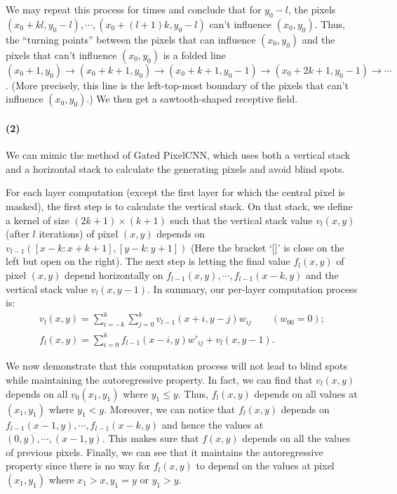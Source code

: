 \documentclass[a4 paper,12pt]{article}
\begin{document}
We may repeat this process for times and conclude that for $y_0-l$, the pixels $(x_0+kl,y_0-l),\cdots,(x_0+(l+1)k,y_0-l)$ can't influence $(x_0,y_0)$. Thus, the ``turning points'' between the pixels that can influence $(x_0,y_0)$ and the pixels that can't influence $(x_0,y_0)$ is a folded line $(x_0+1,y_0)\to (x_0+k+1,y_0)\to (x_0+k+1,y_0-1)\to(x_0+2k+1,y_0-1)\to\cdots$. (More precisely, this line is the left-top-most boundary of the pixels that can't influence $(x_0,y_0)$.)
We then get a sawtooth-shaped receptive field.

\paragraph*{(2)}
We can mimic the method of Gated PixelCNN, which uses both a vertical stack and a horizontal stack to calculate the generating pixels and avoid blind spots.

For each layer computation (except the first layer for which the central pixel is masked), the first step is to calculate the vertical stack. On that stack, we define a kernel of size $(2k+1)\times (k+1)$ such that the vertical stack value $v_l(x,y)$ (after $l$ iterations) of pixel $(x,y)$ depends on $v_{l-1}([x-k:x+k+1],[y-k:y+1])$ (Here the bracket `[]' is close on the left but open on the right). The next step is letting the final value $f_l(x,y)$ of pixel $(x,y)$ depend horizontally on $f_{l-1}(x,y),\cdots,f_{l-1}(x-k,y)$ and the vertical stack value $v_l(x,y-1)$. In summary, our per-layer computation process is:
\begin{gather*}
v_l(x,y)=\sum_{i=-k}^{k}\sum_{j=0}^{k}v_{l-1}(x+i,y-j)w_{ij}\qquad(w_{00}=0);\\
f_l(x,y)=\sum_{i=0}^{k}f_{l-1}(x-i,y)w'_{ij}+v_l(x,y-1).
\end{gather*}

We now demonstrate that this computation process will not lead to blind spots while maintaining the autoregressive property. In fact, we can find that $v_l(x,y)$ depends on all $v_0(x_1,y_1)$ where $y_1\le y$. Thus, $f_l(x,y)$ depends on all values at $(x_1,y_1)$ where $y_1< y$. Moreover, we can notice that $f_l(x,y)$ depends on $f_{l-1}(x-1,y),\cdots,f_{l-1}(x-k,y)$ and hence the values at $(0,y),\cdots,(x-1,y)$. This makes sure that $f(x,y)$ depends on all the values of previous pixels. Finally, we can see that it maintains the autoregressive property since there is no way for $f_l(x,y)$ to depend on the values at pixel $(x_1,y_1)$ where $x_1>x,y_1=y$ or $y_1>y$.


\end{document}
